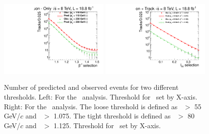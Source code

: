 \begin{figure}
\centering
  \includegraphics[clip=false, trim=0.0cm 0cm 0.0cm 0cm, width=0.48\textwidth]{figures/muonly/Prediction_Data8TeV_NPredVsNObs}
  \includegraphics[clip=false, trim=0.0cm 0cm 0.0cm 0cm, width=0.48\textwidth]{figures/tkmu/Prediction_Data8TeV_NPredVsNObs}
  \caption[Number of predicted and observed events for two different thresholds in the \muononly\ and \tktof\ analyses.]
{Number of predicted and observed events for two different thresholds. 
Left: For the \muononly\ analysis. Threshold for \invbeta\ set by X-axis.
Right: For the \tktof\ analysis. The loose threshold is defined as \pt\ $>$ 55 GeV/$c$ and \invbeta\ $>$ 1.075.
The tight threshold is defined as \pt\ $>$ 80 GeV/$c$ and \invbeta\ $>$ 1.125.  Threshold for \ias\ set by X-axis.}
    \label{fig:PredPt230}
\end{figure}

